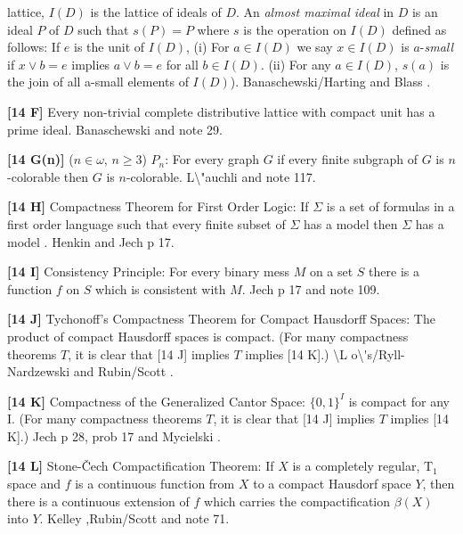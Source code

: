 lattice, $I(D)$ is the lattice of ideals of $D$.  An {\it almost maximal
ideal} in $D$ is an ideal $P$ of $D$ such that $s(P) = P$  where $s$ is
the operation on $I(D)$ defined as follows: If $e$ is the unit of $I(D)$,
(i) For $a\in I(D)$ we say $x\in I(D)$ is $a$-{\it small} if $x\vee b = e$
implies $a\vee b = e$ for all $b \in I(D)$. (ii) For any $a\in I(D)$,
$s(a)$ is the join of all a-small elements of $I(D)$).
\ac{Banaschewski/Harting} \cite{1985} and \ac{Blass} \cite{1986}.
\smallskip
\item{}{\bf [14 F]} Every non-trivial complete distributive lattice with
compact unit has a prime ideal.  \ac{Banaschewski} \cite{1985} and note 29.
\smallskip
\item{}{\bf [14 G(n)]} ($n\in \omega$, $n\ge 3$) $P_{n}$:  For
every graph $G$ if every finite subgraph of $G$ is $n$-colorable
then $G$ is $n$-colorable.  \ac{L\"auchli} \cite{1971} and note 117.
\smallskip
\item{}{\bf [14 H]}  Compactness Theorem for First Order Logic:
If $\Sigma$ is a set of formulas in a first order language such that
every finite subset of $\Sigma$ has a model then $\Sigma$ has a model .
\ac{Henkin} \cite{1954a} and \ac{Jech} \cite{1973b} p 17.
\smallskip
\item{}{\bf [14 I]}  Consistency Principle:  For every binary mess $M$ on
a set $S$ there is a function $f$ on $S$ which is consistent with $M$.
\ac{Jech} \cite{1973b} p 17 and note 109.
\smallskip
\item{}{\bf [14 J]} Tychonoff's Compactness Theorem for Compact Hausdorff
Spaces: The product of compact Hausdorff spaces is compact. (For many
compactness theorems $T$, it is clear that [14 J] implies $T$ implies
[14 K].)  \ac{\L o\'s/Ryll-Nardzewski} \cite{1954} and \ac{Rubin/Scott}
\cite{1954}. 
\smallskip
\item{}{\bf [14 K]} Compactness of the Generalized Cantor Space:
$\{0,1\}^I$ is compact for any I. (For many compactness theorems $T$, it
is clear that [14 J] implies $T$ implies [14 K].)  \ac{Jech} \cite{1973b}
p 28, prob 17 and \ac{Mycielski} \cite{1964}.
\smallskip
\item{}{\bf [14 L]}  Stone-\v Cech Compactification Theorem:  If $X$ is
a completely regular, T$_1$ space and $f$ is a continuous function from
$X$ to a compact Hausdorf space $Y$, then there is a continuous extension
of $f$ which carries the compactification $\beta(X)$ into $Y$.
\ac{Kelley} \cite{1955},\ac{Rubin/Scott} \cite{1954} and note 71.
